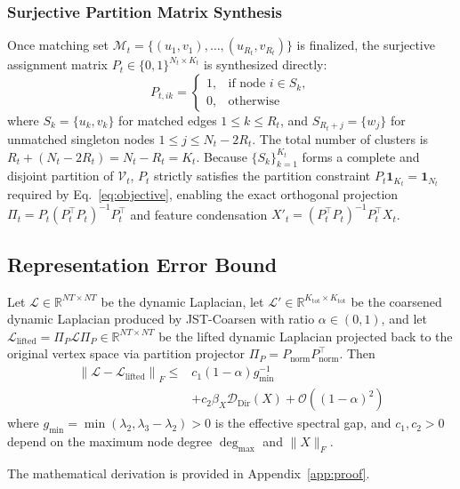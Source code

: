 \documentclass[sigconf]{acmart}
\begin{document}
\subsubsection{Surjective Partition Matrix Synthesis}
\label{sec:partition_synthesis}
Once matching set $\mathcal{M}_t = \{(u_1, v_1), \dots, (u_{R_t}, v_{R_t})\}$ is finalized, the surjective assignment matrix $P_t \in \{0, 1\}^{N_t \times K_t}$ is synthesized directly:
\begin{equation}
\label{eq:partition_synthesis}
P_{t, ik} = \begin{cases}
1, & \text{if node } i \in S_k, \\
0, & \text{otherwise}
\end{cases}
\end{equation}
where $S_k = \{u_k, v_k\}$ for matched edges $1 \le k \le R_t$, and $S_{R_t + j} = \{w_j\}$ for unmatched singleton nodes $1 \le j \le N_t - 2R_t$. The total number of clusters is $R_t + (N_t - 2R_t) = N_t - R_t = K_t$. Because $\{S_k\}_{k=1}^{K_t}$ forms a complete and disjoint partition of $\mathcal{V}_t$, $P_t$ strictly satisfies the partition constraint $P_t \mathbf{1}_{K_t} = \mathbf{1}_{N_t}$ required by Eq.~\eqref{eq:objective}, enabling the exact orthogonal projection $\Pi_t = P_t (P_t^\top P_t)^{-1} P_t^\top$ and feature condensation $X'_t = (P_t^\top P_t)^{-1} P_t^\top X_t$.

\subsection{Representation Error Bound}
\label{sec:bound_theory}
\begin{theorem}
\label{thm:bound}
Let $\mathcal{L} \in \mathbb{R}^{NT \times NT}$ be the dynamic Laplacian, let $\mathcal{L}' \in \mathbb{R}^{K_{\text{tot}} \times K_{\text{tot}}}$ be the coarsened dynamic Laplacian produced by JST-Coarsen with ratio $\alpha \in (0, 1)$, and let $\mathcal{L}_{\text{lifted}} = \Pi_P \mathcal{L} \Pi_P \in \mathbb{R}^{NT \times NT}$ be the lifted dynamic Laplacian projected back to the original vertex space via partition projector $\Pi_P = P_{\text{norm}} P_{\text{norm}}^\top$. Then
\begin{equation}
\label{eq:bound}
\begin{split}
\left\| \mathcal{L} - \mathcal{L}_{\text{lifted}} \right\|_F \le {}& c_1 (1 - \alpha) g_{\min}^{-1} \\
& + c_2 \beta_X \mathcal{D}_{\text{Dir}}(X) + \mathcal{O}\left((1 - \alpha)^2\right)
\end{split}
\end{equation}
where $g_{\min} = \min(\lambda_2, \lambda_3 - \lambda_2) > 0$ is the effective spectral gap, and $c_1, c_2 > 0$ depend on the maximum node degree $\operatorname{deg}_{\max}$ and $\|X\|_F$.
\end{theorem}
The mathematical derivation is provided in Appendix~\ref{app:proof}.
\end{document}
